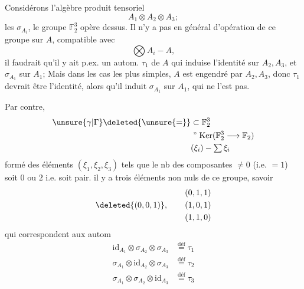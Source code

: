 Considérons l'algèbre produit tensoriel
\[
 A_1\otimes A_2\otimes A_3;
\]
 les $\sigma_{A_i}$, le groupe $\mathbb F_2^3$ opère dessus. Il n'y a pas en général d'opération de ce groupe sur $A$, compatible avec
\[
 \bigotimes A_i\mathbin{-}A,
\]
 il faudrait qu'il y ait p.ex. un autom. $\tau_1$ de $A$ qui induise l'identité sur $A_2,A_3$, et $\sigma_{A_1}$ sur $A_1$; Mais dans les cas les plus simples, $A$ est engendré par $A_2,A_3$, donc $\tau_1$ devrait être l'identité, alors qu'il induit $\sigma_{A_1}$ sur $A_1$, qui ne l'est pas.

Par contre, 
\[
 \begin{aligned}
 \unsure{\gamma|\Gamma}\deleted{\unsure{=}}&\subset\mathbb F_2^3\\
 &\mathrel{\text{''}}\operatorname{Ker}(\mathbb F_2^3\longrightarrow\mathbb F_2)\\
 &(\xi_i)\mathbin{-}\textstyle\sum\xi_i
 \end{aligned}
\]
formé des éléments $(\xi_1,\xi_2,\xi_3)$ tels que le nb des composantes $\ne0$ (i.e. $=1$) soit $0$ ou $2$ i.e. soit pair.  il y  a trois éléments non nuls de ce groupe, savoir
\[
 \deleted{(0,0,1)},\qquad\begin{gathered}(0,1,1)\\(1,0,1)\\(1,1,0)\end{gathered}
\]
qui correspondent aux autom
\[
 \begin{aligned}
 \mathrm{id}_{A_1}\otimes\sigma_{A_2}\otimes\sigma_{A_3}&\overset{\mathrm{déf}}{=}\tau_1\\
 \sigma_{A_1}\otimes\mathrm{id}_{A_2}\otimes\sigma_{A_3}&\overset{\mathrm{déf}}{=}\tau_2\\
 \sigma_{A_1}\otimes\sigma_{A_2}\otimes\mathrm{id}_{A_3}&\overset{\mathrm{déf}}{=}\tau_3
 \end{aligned}
\]
